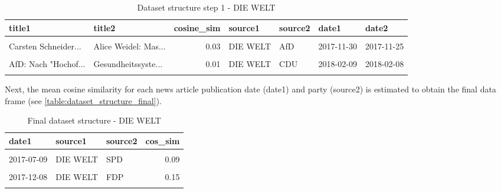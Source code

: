\documentclass[
]{article}
\begin{document}
\begin{table}[H]

\caption{\label{tab:Dataset structure 1}Dataset structure step 1 - DIE WELT \label{table:dataset_structure1}}
\centering
\fontsize{7}{9}\selectfont
\begin{tabular}[t]{llrllll}
\toprule
title1 & title2 & cosine\_sim & source1 & source2 & date1 & date2\\
\midrule
\cellcolor{gray!6}{Deutsche Mehrheit...} & \cellcolor{gray!6}{Europa muss liefern} & \cellcolor{gray!6}{0.03} & \cellcolor{gray!6}{DIE WELT} & \cellcolor{gray!6}{DIE LINKE} & \cellcolor{gray!6}{2017-10-17} & \cellcolor{gray!6}{2017-10-13}\\
Carsten Schneider... & Alice Weidel: Mas... & 0.03 & DIE WELT & AfD & 2017-11-30 & 2017-11-25\\
\cellcolor{gray!6}{Juso-Chef Kevin K...} & \cellcolor{gray!6}{Teilhabe ist ein...} & \cellcolor{gray!6}{0.23} & \cellcolor{gray!6}{DIE WELT} & \cellcolor{gray!6}{CDU} & \cellcolor{gray!6}{2017-12-04} & \cellcolor{gray!6}{2017-12-01}\\
AfD: Nach "Hochof... & Gesundheitssyste... & 0.01 & DIE WELT & CDU & 2018-02-09 & 2018-02-08\\
\cellcolor{gray!6}{Bundesverwaltungs...} & \cellcolor{gray!6}{Staat versagt bei...} & \cellcolor{gray!6}{0.04} & \cellcolor{gray!6}{DIE WELT} & \cellcolor{gray!6}{DIE LINKE} & \cellcolor{gray!6}{2017-11-17} & \cellcolor{gray!6}{2017-11-16}\\
\bottomrule
\end{tabular}
\end{table}

Next, the mean cosine similarity for each news article publication date
(date1) and party (source2) is estimated to obtain the final data frame
(see \autoref{table:dataset_structure_final}).

\begin{table}[H]

\caption{\label{tab:Dataset structure final}Final dataset structure - DIE WELT \label{table:dataset_structure_final}}
\centering
\fontsize{7}{9}\selectfont
\begin{tabular}[t]{lllr}
\toprule
date1 & source1 & source2 & cos\_sim\\
\midrule
\cellcolor{gray!6}{2018-02-10} & \cellcolor{gray!6}{DIE WELT} & \cellcolor{gray!6}{FDP} & \cellcolor{gray!6}{0.12}\\
2017-07-09 & DIE WELT & SPD & 0.09\\
\cellcolor{gray!6}{2017-11-21} & \cellcolor{gray!6}{DIE WELT} & \cellcolor{gray!6}{SPD} & \cellcolor{gray!6}{0.10}\\
2017-12-08 & DIE WELT & FDP & 0.15\\
\cellcolor{gray!6}{2018-01-21} & \cellcolor{gray!6}{DIE WELT} & \cellcolor{gray!6}{AfD} & \cellcolor{gray!6}{0.10}\\
\bottomrule
\end{tabular}
\end{table}
\end{document}
